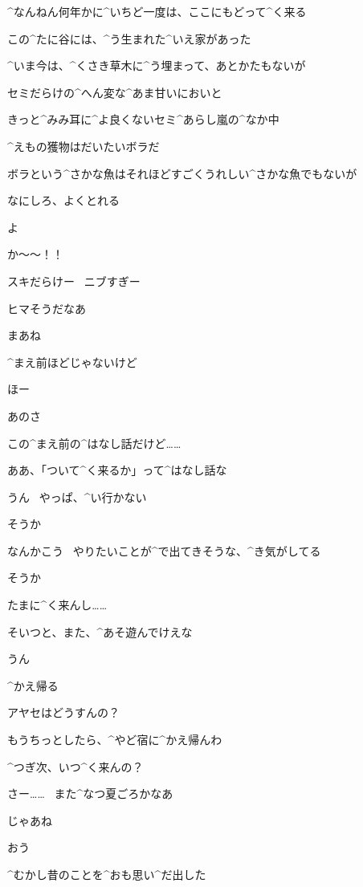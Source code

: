 \page[37]
\Ayase ^{なんねん}{何年}かに^{いちど}{一度}は、ここにもどって^{く}{来}る

\Ayase この^{たに}{谷}には、^{う}{生}まれた^{いえ}{家}があった

\Ayase ^{いま}{今}は、^{くさき}{草木}に^{う}{埋}まって、あとかたもないが

\page
\Ayase セミだらけの^{へん}{変}な^{あま}{甘}いにおいと

\Ayase きっと^{みみ}{耳}に^{よ}{良}くないセミ^{あらし}{嵐}の^{なか}{中}

\page
\Ayase ^{えもの}{獲物}はだいたいボラだ

\Ayase ボラという^{さかな}{魚}はそれほどすごくうれしい^{さかな}{魚}でもないが

\Ayase なにしろ、よくとれる

\page[42]
\Makki よ

\Ayase か〜〜！！

\Makki スキだらけー
\ ニブすぎー

\page
\Ayase ヒマそうだなあ

\Makki まあね

\Makki ^{まえ}{前}ほどじゃないけど

\page
\Ayase ほー

\Makki あのさ

\Makki この^{まえ}{前}の^{はなし}{話}だけど……

\Ayase ああ、「ついて^{く}{来}るか」って^{はなし}{話}な

\Makki うん
\ やっぱ、^{い}{行}かない

\Ayase そうか

\Makki なんかこう
\ やりたいことが^{で}{出}てきそうな、^{き}{気}がしてる

\Ayase そうか

\page
\Ayase たまに^{く}{来}んし……

\Ayase そいつと、また、^{あそ}{遊}んでけえな

\Makki うん

\page[47]
\Makki ^{かえ}{帰}る

\Makki アヤセはどうすんの？

\Ayase もうちっとしたら、^{やど}{宿}に^{かえ}{帰}んわ

\Makki ^{つぎ}{次}、いつ^{く}{来}んの？

\Ayase さー……
\ また^{なつ}{夏}ごろかなあ

\page[49]
\Makki じゃあね

\Ayase おう

\page
\Ayase ^{むかし}{昔}のことを^{おも}{思}い^{だ}{出}した

